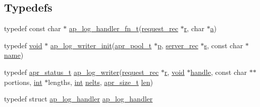 \subsection*{Typedefs}
\begin{DoxyCompactItemize}
\item 
typedef const char $\ast$ \hyperlink{group__MOD__LOG__CONFIG_ga8b3bfba0c0ad4bfc84f9c730478a38ed}{ap\+\_\+log\+\_\+handler\+\_\+fn\+\_\+t}(\hyperlink{structrequest__rec}{request\+\_\+rec} $\ast$\hyperlink{pcregrep_8txt_a2e9e9438b26c0bb4425367a7e4f75eb3}{r}, char $\ast$\hyperlink{pcre_8txt_a841271aab70f5cda9412a19c7753f02c}{a})
\item 
typedef \hyperlink{group__MOD__ISAPI_gacd6cdbf73df3d9eed42fa493d9b621a6}{void} $\ast$ \hyperlink{group__MOD__LOG__CONFIG_ga46489570f9a6d3883db0aad3f4ab93b8}{ap\+\_\+log\+\_\+writer\+\_\+init}(\hyperlink{structapr__pool__t}{apr\+\_\+pool\+\_\+t} $\ast$\hyperlink{group__APACHE__CORE__MPM_ga5cd91701e5c167f2b1a38e70ab57817e}{p}, \hyperlink{structserver__rec}{server\+\_\+rec} $\ast$\hyperlink{pcretest_8txt_a062597889ba244b72877454b1d3adecf}{s}, const char $\ast$\hyperlink{pcre_8txt_a5a15d68aadb41c771fe50a27c400d49b}{name})
\item 
typedef \hyperlink{group__apr__errno_gaa5105fa83cc322f09382292db8b47593}{apr\+\_\+status\+\_\+t} \hyperlink{group__MOD__LOG__CONFIG_gad20836f7acb84e4b4e8ea3031db5aa68}{ap\+\_\+log\+\_\+writer}(\hyperlink{structrequest__rec}{request\+\_\+rec} $\ast$\hyperlink{pcregrep_8txt_a2e9e9438b26c0bb4425367a7e4f75eb3}{r}, \hyperlink{group__MOD__ISAPI_gacd6cdbf73df3d9eed42fa493d9b621a6}{void} $\ast$\hyperlink{group__APR__Util__DBD_ga3ae8808b1c40205ec08c75783ac68810}{handle}, const char $\ast$$\ast$portions, \hyperlink{pcre_8txt_a42dfa4ff673c82d8efe7144098fbc198}{int} $\ast$lengths, \hyperlink{pcre_8txt_a42dfa4ff673c82d8efe7144098fbc198}{int} \hyperlink{group__apr__tables_ga3f892b271cc0564b2d8e9536a96abd7c}{nelts}, \hyperlink{group__apr__platform_gaaa72b2253f6f3032cefea5712a27540e}{apr\+\_\+size\+\_\+t} \hyperlink{group__APR__Util__XML_ga1e9401816e3a1cf930f448db46978ea7}{len})
\item 
typedef struct \hyperlink{structap__log__handler}{ap\+\_\+log\+\_\+handler} \hyperlink{group__MOD__LOG__CONFIG_ga11fc4514f41d38dc2bf396d7ad071a88}{ap\+\_\+log\+\_\+handler}
\end{DoxyCompactItemize}
